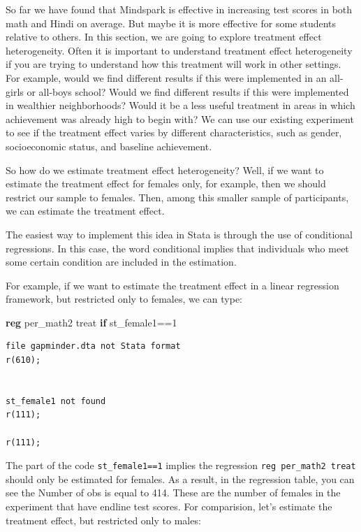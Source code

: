 \documentclass[
]{book}
\newenvironment{Shaded}{\begin{snugshade}}{\end{snugshade}}
\newcommand{\KeywordTok}[1]{\textcolor[rgb]{0.13,0.29,0.53}{\textbf{#1}}}
\newcommand{\NormalTok}[1]{#1}
\begin{document}
So far we have found that Mindspark is effective in increasing test scores in both math and Hindi on average. But maybe it is more effective for some students relative to others. In this section, we are going to explore treatment effect heterogeneity. Often it is important to understand treatment effect heterogeneity if you are trying to understand how this treatment will work in other settings. For example, would we find different results if this were implemented in an all-girls or all-boys school? Would we find different results if this were implemented in wealthier neighborhoods? Would it be a less useful treatment in areas in which achievement was already high to begin with? We can use our existing experiment to see if the treatment effect varies by different characteristics, such as gender, socioeconomic status, and baseline achievement.

So how do we estimate treatment effect heterogeneity? Well, if we want to estimate the treatment effect for females only, for example, then we should restrict our sample to females. Then, among this smaller sample of participants, we can estimate the treatment effect.

The easiest way to implement this idea in Stata is through the use of conditional regressions. In this case, the word conditional implies that individuals who meet some certain condition are included in the estimation.

For example, if we want to estimate the treatment effect in a linear regression framework, but restricted only to females, we can type:

\begin{Shaded}
\begin{Highlighting}[]
\KeywordTok{reg}\NormalTok{ per\_math2 treat }\KeywordTok{if}\NormalTok{ st\_female1==1}
\end{Highlighting}
\end{Shaded}

\begin{verbatim}
file gapminder.dta not Stata format
r(610);


st_female1 not found
r(111);

r(111);
\end{verbatim}

The part of the code \texttt{st\_female1==1} implies the regression \texttt{reg\ per\_math2\ treat} should only be estimated for females. As a result, in the regression table, you can see the Number of obs is equal to 414. These are the number of females in the experiment that have endline test scores. For comparision, let's estimate the treatment effect, but restricted only to males:
\end{document}
